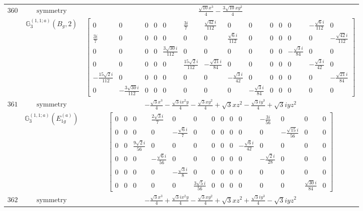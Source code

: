 \documentclass[fleqn,8pt,landscape]{jsarticle}
\begin{document}
\begin{longtable}{ccc}
$ 360 $ & $ \text{symmetry} $ & $ \frac{\sqrt{10} x^{3}}{4} - \frac{3 \sqrt{10} x y^{2}}{4} $ \\
$  $ & $ \mathbb{G}_{3}^{(1,1;a)}(B_{g},2) $ & $ \begin{bmatrix} 0 & 0 & 0 & 0 & 0 & \frac{3 i}{7} & \frac{\sqrt{42} i}{112} & 0 & 0 & 0 & 0 & 0 & - \frac{\sqrt{6} i}{112} & 0 \\ \frac{3 i}{7} & 0 & 0 & 0 & 0 & 0 & 0 & \frac{\sqrt{6} i}{112} & 0 & 0 & 0 & 0 & 0 & - \frac{\sqrt{42} i}{112} \\ 0 & 0 & 0 & 0 & \frac{3 \sqrt{30} i}{112} & 0 & 0 & 0 & 0 & 0 & 0 & - \frac{\sqrt{3} i}{84} & 0 & 0 \\ 0 & 0 & 0 & 0 & 0 & \frac{15 \sqrt{2} i}{112} & - \frac{\sqrt{21} i}{84} & 0 & 0 & 0 & 0 & 0 & - \frac{\sqrt{3} i}{42} & 0 \\ - \frac{15 \sqrt{2} i}{112} & 0 & 0 & 0 & 0 & 0 & 0 & - \frac{\sqrt{3} i}{42} & 0 & 0 & 0 & 0 & 0 & - \frac{\sqrt{21} i}{84} \\ 0 & - \frac{3 \sqrt{30} i}{112} & 0 & 0 & 0 & 0 & 0 & 0 & - \frac{\sqrt{3} i}{84} & 0 & 0 & 0 & 0 & 0 \end{bmatrix} $ \\ \hline
$ 361 $ & $ \text{symmetry} $ & $ - \frac{\sqrt{3} x^{3}}{4} - \frac{\sqrt{3} i x^{2} y}{4} - \frac{\sqrt{3} x y^{2}}{4} + \sqrt{3} x z^{2} - \frac{\sqrt{3} i y^{3}}{4} + \sqrt{3} i y z^{2} $ \\
$  $ & $ \mathbb{G}_{3}^{(1,1;a)}(E_{1g}^{(a)}) $ & $ \begin{bmatrix} 0 & 0 & 0 & \frac{2 \sqrt{3} i}{7} & 0 & 0 & 0 & 0 & 0 & 0 & - \frac{3 i}{56} & 0 & 0 & 0 \\ 0 & 0 & 0 & 0 & - \frac{\sqrt{6} i}{7} & 0 & 0 & 0 & 0 & 0 & 0 & - \frac{\sqrt{15} i}{56} & 0 & 0 \\ 0 & 0 & \frac{9 \sqrt{2} i}{56} & 0 & 0 & 0 & 0 & 0 & 0 & - \frac{\sqrt{6} i}{42} & 0 & 0 & 0 & 0 \\ 0 & 0 & 0 & - \frac{\sqrt{6} i}{56} & 0 & 0 & 0 & 0 & 0 & 0 & - \frac{\sqrt{2} i}{28} & 0 & 0 & 0 \\ 0 & 0 & 0 & 0 & - \frac{\sqrt{3} i}{8} & 0 & 0 & 0 & 0 & 0 & 0 & 0 & 0 & 0 \\ 0 & 0 & 0 & 0 & 0 & \frac{3 \sqrt{5} i}{56} & 0 & 0 & 0 & 0 & 0 & 0 & \frac{\sqrt{30} i}{84} & 0 \end{bmatrix} $ \\ \hline
$ 362 $ & $ \text{symmetry} $ & $ - \frac{\sqrt{3} x^{3}}{4} + \frac{\sqrt{3} i x^{2} y}{4} - \frac{\sqrt{3} x y^{2}}{4} + \sqrt{3} x z^{2} + \frac{\sqrt{3} i y^{3}}{4} - \sqrt{3} i y z^{2} $ \\

\end{longtable}
\end{document}
